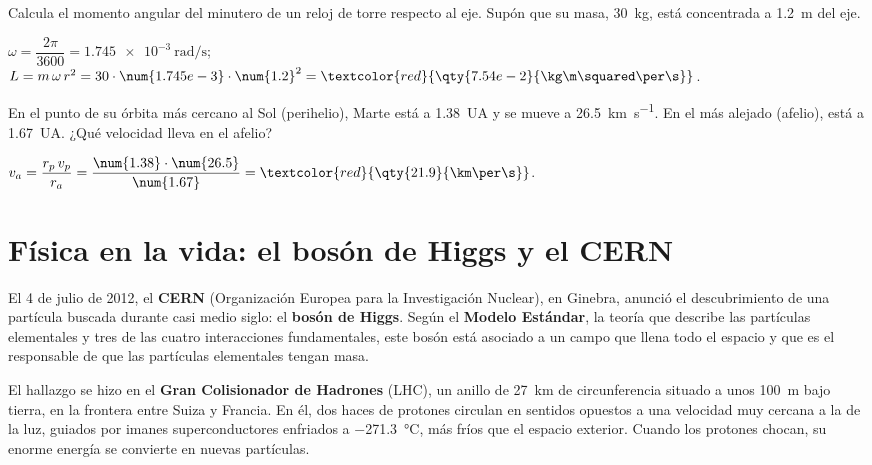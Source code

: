 \begin{exercise}
    Calcula el momento angular del minutero de un reloj de torre respecto al eje. Supón que su masa, \qty{30}{\kg}, está concentrada
    a \qty{1.2}{\m} del eje.
    \begin{solu}
        \(\omega = \dfrac{2\pi}{3600} = \qty{1.745e-3}{\radian\per\s}\); \(L = m\,\omega\,r^2 = 30 \cdot \num{1.745e-3} \cdot \num{1.2}^2 =
        \textcolor{red}{\qty{7.54e-2}{\kg\m\squared\per\s}}\).
    \end{solu}
\end{exercise}

\begin{exercise}
    En el punto de su órbita más cercano al Sol (perihelio), Marte está a \qty{1.38}{UA} y se mueve a \qty{26.5}{\km\per\s}. En el
    más alejado (afelio), está a \qty{1.67}{UA}. ¿Qué velocidad lleva en el afelio?
    \begin{solu}
        \(v_a = \dfrac{r_p\,v_p}{r_a} = \dfrac{\num{1.38} \cdot \num{26.5}}{\num{1.67}} = \textcolor{red}{\qty{21.9}{\km\per\s}}\).
    \end{solu}
\end{exercise}

\section{Física en la vida: el bosón de Higgs y el CERN}\label{sec:ud10-higgs}

El 4 de julio de 2012, el \textbf{CERN} (Organización Europea para la Investigación Nuclear), en Ginebra, anunció el descubrimiento de
una partícula buscada durante casi medio siglo: el \textbf{bosón de Higgs}. Según el \textbf{Modelo Estándar}, la teoría que describe las
partículas elementales y tres de las cuatro interacciones fundamentales, este bosón está asociado a un campo que llena todo el
espacio y que es el responsable de que las partículas elementales tengan masa.

El hallazgo se hizo en el \textbf{Gran Colisionador de Hadrones} (LHC), un anillo de \qty{27}{\km} de circunferencia situado a unos
\qty{100}{\m} bajo tierra, en la frontera entre Suiza y Francia. En él, dos haces de protones circulan en sentidos opuestos a una
velocidad muy cercana a la de la luz, guiados por imanes superconductores enfriados a \qty{-271.3}{\celsius}, más fríos que el espacio
exterior. Cuando los protones chocan, su enorme energía se convierte en nuevas partículas.

